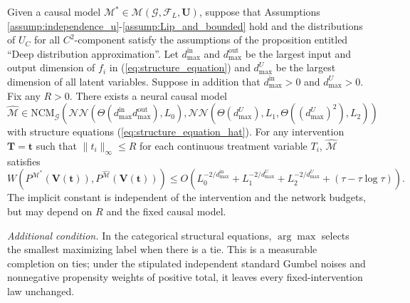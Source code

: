 \begin{corollary}\label{corollary:deep_nn}
Given a causal model $\mathcal M^*\in\mathcal M(\mathcal G,\mathcal F_L,\boldsymbol U)$, suppose that Assumptions \ref{assump:independence_u}-\ref{assump:Lip_and_bounded} hold and the distributions of $U_C$ for all $C^2$-component satisfy the assumptions of the proposition entitled ``Deep distribution approximation''. Let $d_{\max}^{\text{in}}$ and $d_{\max}^{\text{out}}$ be the largest input and output dimension of $f_i$ in (\ref{eq:structure_equation}) and $d_{\max}^U$ be the largest dimension of all latent variables. Suppose in addition that $d_{\max}^{\text{in}}>0$ and $d_{\max}^U>0$. Fix any $R>0$. There exists a neural causal model 
  $$\hat{\mathcal{M}} \in \text{NCM}_{\mathcal{G}} ( \mathcal{NN}(\Theta( d^{\text{in}}_{\max}d^{\text{out}}_{\max}) ,L_{0}) , \mathcal{NN}(\Theta(d_{\max}^U),L_1,\Theta((d_{\max}^U)^2),L_2))$$ with structure equations (\ref{eq:structure_equation_hat}). For any intervention $\boldsymbol{T}=\boldsymbol{t}$ such that $\|t_i\|_\infty\leqslant R$ for each continuous treatment variable $T_i$, $\hat{\mathcal M}$ satisfies
\begin{equation*}
W\left(P^{\mathcal M^*}(\boldsymbol V(\boldsymbol t)),P^{\hat{\mathcal M}}(\boldsymbol V(\boldsymbol t))\right)\leqslant O\left(L_0^{-2/d_{\max}^{\text{in}}}+L_1^{-2/d_{\max}^U}+L_2^{-2/d_{\max}^U}+(\tau-\tau\log\tau)\right).
\end{equation*}
The implicit constant is independent of the intervention and the network budgets, but may depend on $R$ and the fixed causal model.

\emph{Additional condition.} In the categorical structural equations, $\arg\max$ selects the smallest maximizing label when there is a tie. This is a measurable completion on ties; under the stipulated independent standard Gumbel noises and nonnegative propensity weights of positive total, it leaves every fixed-intervention law unchanged.
\end{corollary}

